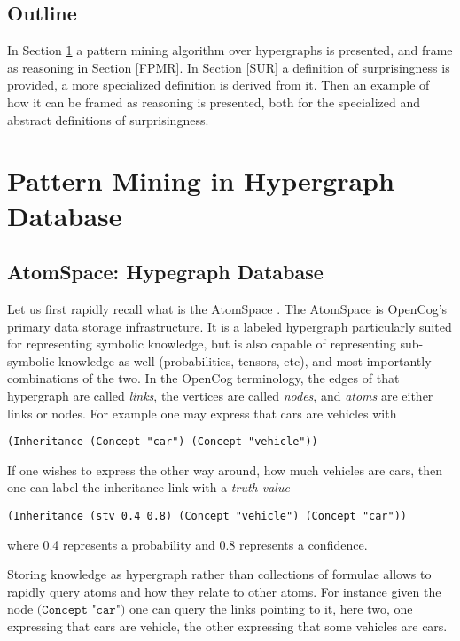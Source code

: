\documentclass[runningheads]{llncs}
\begin{document}
\subsection{Outline}

In Section \ref{PMHD} a pattern mining algorithm over hypergraphs is
presented, and frame as reasoning in Section \ref{FPMR}. In Section
\ref{SUR} a definition of surprisingness is provided, a more
specialized definition is derived from it. Then an example of how it
can be framed as reasoning is presented, both for the specialized and
abstract definitions of surprisingness.

\section{Pattern Mining in Hypergraph Database}
\label{PMHD}

\subsection{AtomSpace: Hypegraph Database}

Let us first rapidly recall what is the AtomSpace
\cite{Goertzel2014}. The AtomSpace is OpenCog's primary data storage
infrastructure. It is a labeled hypergraph particularly suited for
representing symbolic knowledge, but is also capable of representing
sub-symbolic knowledge as well (probabilities, tensors, etc), and most
importantly combinations of the two. In the OpenCog terminology, the
edges of that hypergraph are called \emph{links}, the vertices are
called \emph{nodes}, and \emph{atoms} are either links or nodes.  For
example one may express that cars are vehicles with
\begin{verbatim}
(Inheritance (Concept "car") (Concept "vehicle"))
\end{verbatim}
If one wishes to express the other way around, how much vehicles are
cars, then one can label the inheritance link with a \emph{truth
  value}
\begin{verbatim}
(Inheritance (stv 0.4 0.8) (Concept "vehicle") (Concept "car"))
\end{verbatim}
where 0.4 represents a probability and 0.8 represents a confidence.

Storing knowledge as hypergraph rather than collections of formulae
allows to rapidly query atoms and how they relate to other atoms. For
instance given the node $\texttt{(Concept "car")}$ one can query the
links pointing to it, here two, one expressing that cars are vehicle,
the other expressing that some vehicles are cars.
\end{document}

